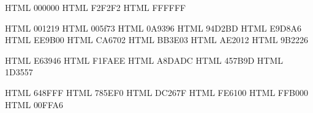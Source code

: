 

\definecolor{BaseBlack}       {HTML} {000000}
\definecolor{BaseGrey}        {HTML} {F2F2F2}
\definecolor{BaseWhite}       {HTML} {FFFFFF}


\definecolor{RichBlackFOGRA}  {HTML} {001219}
\definecolor{BlueSapphire}    {HTML} {005f73}
\definecolor{ViridianGreen}   {HTML} {0A9396}
\definecolor{MiddleBlueGreen} {HTML} {94D2BD}
\definecolor{MediumChampagne} {HTML} {E9D8A6}
\definecolor{Gamboge}         {HTML} {EE9B00}
\definecolor{AlloyOrange}     {HTML} {CA6702}
\definecolor{Mahogany}        {HTML} {BB3E03}
\definecolor{Rufous}          {HTML} {AE2012}
\definecolor{RubyRed}         {HTML} {9B2226}


\definecolor{ImperialRed}     {HTML} {E63946}
\definecolor{Honeydew}        {HTML} {F1FAEE}
\definecolor{PowderBlue}      {HTML} {A8DADC}
\definecolor{CeladonBlue}     {HTML} {457B9D}
\definecolor{PrussianBlue}    {HTML} {1D3557}


\definecolor{CornflowerBlue}  {HTML} {648FFF}
\definecolor{MediumSlateBlue} {HTML} {785EF0}
\definecolor{MexicanPink}     {HTML} {DC267F}
\definecolor{OrangePantone}   {HTML} {FE6100}
\definecolor{SelectiveYellow} {HTML} {FFB000}
\definecolor{Aquamarine}      {HTML} {00FFA6}

